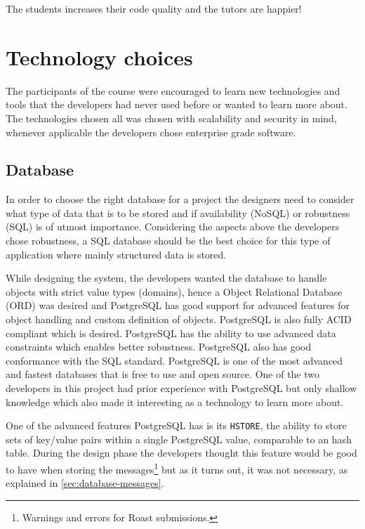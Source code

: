\documentclass[12pt,a4paper]{report}
\begin{document}
The students increases their code quality and the tutors are happier!



\chapter{Technology choices}
The participants of the course were encouraged to learn new technologies and tools that the developers had never used before or wanted to learn more about. The technologies chosen all was chosen with scalability and security in mind, whenever applicable the developers chose enterprise grade software.

\section{Database}
In order to choose the right database for a project the designers need to consider what type of data that is to be stored and if availability (NoSQL) or robustness (SQL) is of utmost importance.
Considering the aspects above the developers chose robustness, a SQL database should be the best choice for this type of application where mainly structured data is stored. 

While designing the system, the developers wanted the database to handle objects with strict value types (domains), hence a Object Relational Database (ORD) was desired and PostgreSQL has good support for advanced features for object handling and custom definition of objects. PostgreSQL is also fully ACID compliant\cite{pg-acid} which is desired. PostgreSQL has the ability to use advanced data constraints which enables better robustness. PostgreSQL also has good conformance with the SQL standard\cite{pg-sql-conformance}. PostgreSQL is one of the most advanced and fastest databases\cite{db-benchmark} that is free to use and open source.
One of the two developers in this project had prior experience with PostgreSQL but only shallow knowledge which also made it interesting as a technology to learn more about.

One of the advanced features PostgreSQL has is its \texttt{HSTORE}, the ability to store sets of key/value pairs within a single PostgreSQL value\cite{pg-hstore}, comparable to an hash table. During the design phase the developers thought this feature would be good to have when storing the messages\footnote{Warnings and errors for Roast submissions.} but as it turns out, it was not necessary, as explained in \autoref{sec:database-messages}.
\end{document}
